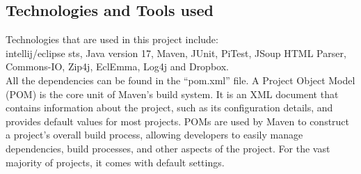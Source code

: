 \subsection{Technologies and Tools used}
Technologies that are used in this project include:\\
intellij/eclipse sts, Java version 17, Maven, JUnit, PiTest, JSoup HTML Parser, Commons-IO, Zip4j, EclEmma, Log4j and Dropbox. \\
All the dependencies can be found in the “pom.xml” file.
\newline A Project Object Model (POM) is the core unit of Maven's build system. It is an XML document that contains information about the project, such as its configuration details, and provides default values for most projects. POMs are used by Maven to construct a project's overall build process, allowing developers to easily manage dependencies, build processes, and other aspects of the project. For the vast majority of projects, it comes with default settings.
